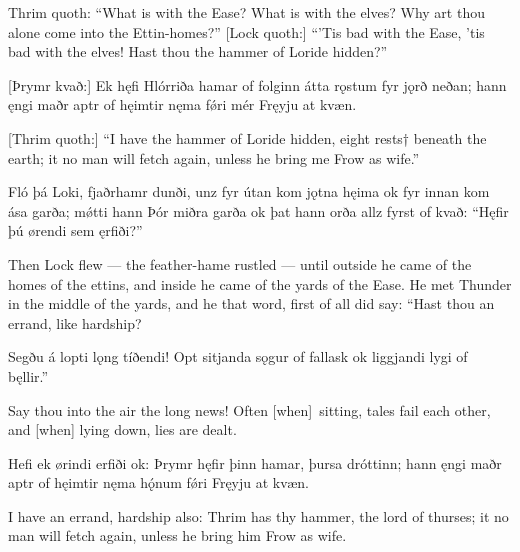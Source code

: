 Thrim quoth:
“What is with the Ease? What is with the elves? Why art thou alone come into the Ettin-homes?”
[Lock quoth:]
“'Tis bad with the Ease, 'tis bad with the elves! Hast thou the hammer of Loride hidden?”

[Þrymr kvað:]
Ek hęfi Hlórriða \hld hamar of folginn
átta rǫstum \hld fyr jǫrð neðan;
hann ęngi maðr \hld aptr of hęimtir
nęma fǿri mér \hld Fręyju at kvæn.

[Thrim quoth:]
“I have the hammer of Loride hidden, eight rests† beneath the earth; it no man will fetch again, unless he bring me Frow as wife.”

Fló þá Loki, \hld fjaðrhamr dunði,
unz fyr útan kom \hld jǫtna hęima
ok fyr innan kom \hld ása garða;
mǿtti hann Þór \hld miðra garða
ok þat hann orða \hld allz fyrst of kvað:
“Hęfir þú ørendi \hld sem ęrfiði?”

Then Lock flew — the feather-hame rustled — until outside he came of the homes of the ettins, and inside he came of the yards of the Ease. He met Thunder in the middle of the yards, and he that word, first of all did say: “Hast thou an errand, like hardship?

Segðu á lopti \hld lǫng tíðendi!
Opt sitjanda \hld sǫgur of fallask
ok liggjandi \hld lygi of bęllir.”

Say thou into the air the long news! Often [when] sitting, tales fail each other, and [when] lying down, lies are dealt.\footnotemark[1]

Hefi ek ørindi \hld erfiði ok:
Þrymr hęfir þinn hamar, \hld þursa dróttinn;
hann ęngi maðr \hld aptr of hęimtir
nęma hǫ́num fǿri \hld Fręyju at kvæn.

I have an errand, hardship also: Thrim has thy hammer, the lord of thurses; it no man will fetch again, unless he bring him Frow as wife.
